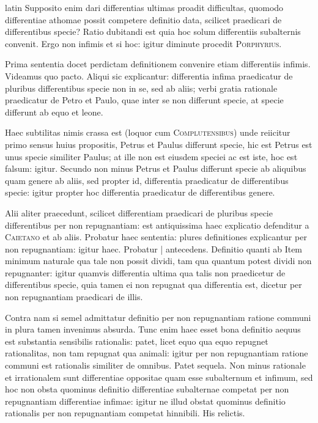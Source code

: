 \begin{otherlanguage*}{latin}
\pstart
 Supposito enim dari differentias ultimas proadit difficultas, quomodo differentiae athomae possit competere definitio data, scilicet praedicari de differentibus specie? Ratio dubitandi est quia hoc solum differentiis subalternis convenit. Ergo non infimis et si hoc: igitur diminute procedit \textsc{Porphyrius}. 
\pend

\pstart
 Prima sententia docet perdictam definitionem convenire etiam differentiis infimis. Videamus quo pacto. Aliqui sic explicantur: differentia infima praedicatur de pluribus differentibus specie non in se, sed ab aliis; verbi gratia rationale praedicatur de Petro et Paulo, quae inter se non differunt specie, at specie differunt ab equo et leone. 
\pend

\pstart
 Haec subtilitas nimis crassa est (loquor cum \textsc{Complutensibus}\index[persons]{}) unde reiicitur primo sensus huius propositis, Petrus et Paulus differunt specie, hic est Petrus est unus specie similiter Paulus; at ille non est eiusdem speciei ac est iste, hoc est falsum: igitur. Secundo non minus Petrus et Paulus differunt specie ab aliquibus quam genere ab aliis, sed propter id, differentia praedicatur de differentibus specie: igitur propter hoc differentia praedicatur de differentibus genere. 
\pend

\pstart
  Alii aliter praecedunt, scilicet differentiam praedicari de pluribus specie differentibus per non repugnantiam: est antiquissima haec explicatio defenditur a \textsc{Caietano} et ab aliis. Probatur haec sententia: plures definitiones explicantur per non repugnantiam: igitur haec. Probatur \textnormal{|}   antecedens. Definitio quanti ab  Item minimum naturale qua tale non possit dividi, tam qua quantum potest dividi non repugnanter: igitur quamvis differentia ultima qua talis non praedicetur de differentibus specie, quia tamen ei non repugnat qua differentia est, dicetur per non repugnantiam praedicari de illis. 
\pend

\pstart
 Contra nam si semel admittatur definitio per non repugnantiam ratione communi in plura tamen invenimus absurda. Tunc enim haec esset bona definitio aequus est substantia sensibilis rationalis: patet, licet equo qua equo repugnet rationalitas, non tam repugnat qua animali: igitur per non repugnantiam ratione communi est rationalis similiter de omnibus. Patet sequela. Non minus rationale et irrationalem sunt differentiae oppositae quam esse subalternum et infimum, sed hoc non obsta quominus definitio differentiae subalternae competat per non repugnantiam differentiae infimae: igitur ne illud obstat quominus definitio rationalis per non repugnantiam competat hinnibili. His relictis. 
\pend


\end{otherlanguage*}
